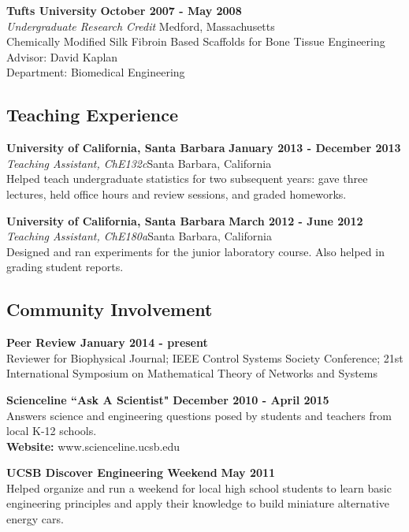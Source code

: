 {{\bf Tufts University} \hfill {\bf October 2007 - May 2008}\\
{\em Undergraduate Research Credit} \hfill Medford, Massachusetts\\
Chemically Modified Silk Fibroin Based Scaffolds for Bone Tissue Engineering\\
Advisor: David Kaplan\\
Department: Biomedical Engineering

\subsection*{Teaching Experience}
{\bf University of California, Santa Barbara}  \hfill {\bf January 2013 -
  December 2013}\\
{\em Teaching Assistant, ChE132c}\hfill  Santa Barbara, California\\
Helped teach undergraduate statistics for two subsequent years: gave three
lectures, held office hours and review sessions, and graded homeworks.

{\bf University of California, Santa Barbara} \hfill {\bf March 2012 - June 2012}\\
{\em Teaching Assistant, ChE180a}\hfill  Santa Barbara, California\\
Designed and ran experiments for the junior laboratory course. Also helped in grading student reports.

\subsection*{Community Involvement}
{\bf Peer Review \hfill January 2014 - present}\\
Reviewer for Biophysical Journal;  IEEE Control Systems Society Conference; 21st International Symposium on
Mathematical Theory of Networks and Systems

{\bf Scienceline ``Ask A Scientist"} \hfill {\bf December 2010 - April 2015}\\
Answers science and engineering questions posed by students and teachers from local K-12 schools. \\
{\bfseries Website:} www.scienceline.ucsb.edu

{\bf UCSB Discover Engineering Weekend} \hfill {\bf May 2011}\\
Helped organize and run a weekend for local high school students to learn basic engineering principles and apply their knowledge to build miniature alternative energy cars.

}
